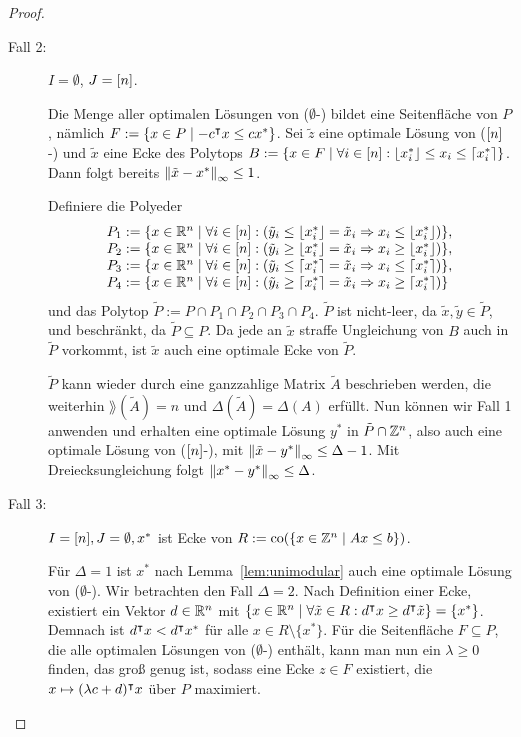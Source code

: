 \begin{proof}
\begin{description}
		\item[Fall 2:] $I=\emptyset$, $J=[n]$.
		
		Die Menge aller optimalen Lösungen von ($\emptyset$-\MIPI) bildet eine Seitenfläche von $P$, nämlich $F:=\{x\in P\mid -c^\intercal x \leq cx^* \}$.
		Sei $\tilde{z}$ eine optimale Lösung von ($[n]$-\MIPI) und $\tilde{x}$ eine Ecke des Polytops $B:=\{ x\in F \mid \forall i \in [n]: \left\lfloor x^*_i \right\rfloor \leq x_i \leq \left\lceil x^*_i \right\rceil \}$.
		Dann folgt bereits $\left\lVert\tilde{x}-x^*\right\rVert_\infty\leq 1$.
		
		Definiere die Polyeder
		$$
		\begin{array}{l}
		P_1:= \{ x\in\mathbb{R}^n \mid \forall i\in[n]: (\tilde{y}_i\leq \left\lfloor x^*_i \right\rfloor = \tilde{x}_i \Rightarrow x_i \leq \left\lfloor x^*_i \right\rfloor)\},\\
		P_2:= \{ x\in\mathbb{R}^n \mid \forall i\in[n]: (\tilde{y}_i\geq \left\lfloor x^*_i \right\rfloor = \tilde{x}_i \Rightarrow x_i \geq \left\lfloor x^*_i \right\rfloor)\}, \\
		P_3:= \{ x\in\mathbb{R}^n \mid \forall i\in[n]: (\tilde{y}_i\leq \left\lceil x^*_i \right\rceil = \tilde{x}_i \Rightarrow x_i \leq \left\lceil x^*_i \right\rceil)\},\\
		P_4:= \{ x\in\mathbb{R}^n \mid \forall i\in[n]: (\tilde{y}_i\geq \left\lceil x^*_i \right\rceil = \tilde{x}_i \Rightarrow x_i \geq \left\lceil x^*_i \right\rceil)\}
		\end{array}
		$$
		und das Polytop $\tilde{P}:=P\cap P_1 \cap P_2 \cap P_3 \cap P_4$.
		$\tilde{P}$ ist nicht-leer, da $\tilde{x}, \tilde{y}\in\tilde{P}$, und beschränkt, da $\tilde{P}\subseteq P$.
		Da jede an $\tilde{x}$ straffe Ungleichung von $B$ auch in $\tilde{P}$ vorkommt, ist $\tilde{x}$ auch eine optimale Ecke von $\tilde{P}$.
		
		$\tilde{P}$ kann wieder durch eine ganzzahlige Matrix $\tilde{A}$ beschrieben werden, die weiterhin $\rang(\tilde{A})=n$ und $\Delta(\tilde{A})=\Delta(A)$ erfüllt.
		Nun können wir Fall 1 anwenden und erhalten eine optimale Lösung $y^*$ in $\tilde{P}\cap\mathbb{Z}^n$, also auch eine optimale Lösung von ($[n]$-\MIPI), mit $\left\lVert\tilde{x} -y^*\right\rVert_\infty\leq \Delta -1$.
		Mit Dreiecksungleichung folgt $\left\lVert x^* - y^*\right\rVert_\infty\leq \Delta$.
		
		\item[Fall 3:] $I=[n],J=\emptyset,x^*$ ist Ecke von $R:=\operatorname{co}(\{ x\in\mathbb{Z}^n \mid Ax\leq b \})$.
		
		Für $\Delta=1$ ist $x^*$ nach Lemma~\ref{lem:unimodular} auch eine optimale Lösung von ($\emptyset$-\MIPI).
		Wir betrachten den Fall $\Delta=2$.
		Nach Definition einer Ecke, existiert ein Vektor $d\in\mathbb{R}^n$ mit $\{ x\in\mathbb{R}^n \mid \forall \tilde{x}\in R: d^\intercal x \geq d^\intercal\tilde{x} \}=\{x^*\}$.
		Demnach ist $d^\intercal x < d^\intercal x^*$ für alle $x\in R\setminus\{x^*\}$.
		Für die Seitenfläche $F\subseteq P$, die alle optimalen Lösungen von ($\emptyset$-\MIPI) enthält, kann man nun ein $\lambda\geq0$ finden, das groß genug ist, sodass eine Ecke $z\in F$ existiert, die $x\mapsto (\lambda c+d)^\intercal x$ über $P$ maximiert. 
		

\end{description}
\end{proof}
